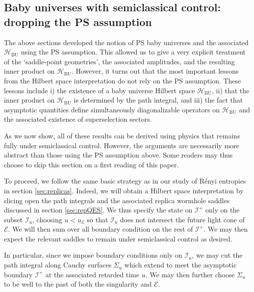 \documentclass[letterpaper,12pt]{article}
\newcommand*{\hbu}{\mathcal{H}_\text{BU}} %
\newcommand*{\scri}{\mathscr{I}} %
\newcommand*{\evap}{\mathscr{E}} %
\begin{document}
\subsection{Baby universes with semiclassical control: dropping the PS assumption}
\label{sec:DropPS}


The above sections developed the notion of PS baby universes and the associated $\hbu$ using the PS assumption.  This allowed us to give a very explicit treatment of the `saddle-point geometries', the associated amplitudes, and the resulting inner product on $\hbu$.  However, it turns out that the most important lessons from the Hilbert space interpretation do not rely on the PS assumption.  These lessons include i) the existence of a baby universe Hilbert space $\hbu$, ii) that the inner product on $\hbu$ is determined  by the path integral, and iii) the fact that asymptotic quantities define simultaneously diagonalizable operators on $\hbu$ and the associated existence of superselection sectors.

As we now show, all of these results can be derived using physics that remains fully under semiclassical control.  However,  the arguments are necessarily more abstract than those using the PS assumption above.  Some readers may thus choose to skip this section on a first reading of this paper.

To proceed, we follow the same basic strategy as in our study of R\'enyi entropies in section \ref{sec:replicas}.  Indeed, we will obtain a Hilbert space interpretation by slicing open the path integrals and the associated replica wormhole saddles discussed in section \ref{sec:repQES}. We thus specify the state on $\scri^+$ only on the subset $\scri_u$, choosing $u < u_\evap$ so that $\scri_u$ does not intersect the future light cone of $\evap$.
We will then sum over all boundary condition on the rest of $\scri^+$.  We may then expect the relevant saddles to remain under semiclassical control as desired.

In particular, since we impose boundary conditions only on $\scri_u$, we may cut the path integral along Cauchy surfaces $\Sigma_u$ which extend to meet the asymptotic boundary $\scri^+$ at the associated retarded time $u$.  We may then further choose $\Sigma_u$ to be well to the past of both the singularity and $\evap$.
\end{document}
